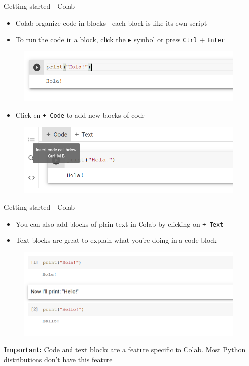 \documentclass[aspectratio=169]{beamer}
\begin{document}
\begin{frame}{Getting started - Colab}

	\begin{itemize}
		\item Colab organize code in blocks - each block is like its own script
		\item To run the code in a block, 
		click the $\blacktriangleright$ symbol or press \texttt{Ctrl} + \texttt{Enter}
	\end{itemize}

	\begin{figure}
		\centering
		\includegraphics[width=0.6\linewidth]{img/block_of_code.png}
	\end{figure}

	\begin{itemize}
		\item Click on \texttt{+ Code} to add new blocks of code
	\end{itemize}

	\begin{figure}
		\centering
		\includegraphics[width=0.6\linewidth]{img/add_code.png}
	\end{figure}

\end{frame}

\begin{frame}{Getting started - Colab}

	\begin{itemize}
		\item You can also add blocks of plain text in Colab by clicking on \texttt{+ Text}
		\item Text blocks are great to explain what you're doing in a code block
	\end{itemize}

	\begin{figure}
		\centering
		\includegraphics[width=0.6\linewidth]{img/text_block_between_code_blocks.png}
	\end{figure}

	\textbf{Important:} Code and text blocks are a feature specific to Colab. Most Python distributions don't have this feature

\end{frame}
\end{document}
